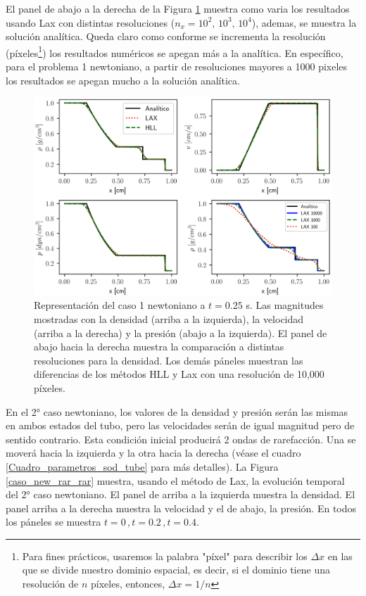 \documentclass[12pt,a4paper]{book}
\begin{document}
El panel de abajo a la derecha de la Figura 
\ref{comparacion_analitico_newtoniano_caso_1} muestra como varia los resultados
usando Lax con distintas resoluciones ($n_x = 10^2, \, 10^3, \,10^4$), ademas, se muestra la solución
analítica.
Queda claro como 
conforme se incrementa la resolución (píxeles\footnote{Para fines prácticos, usaremos la palabra "píxel" para describir los $\Delta x$ en 
las que se divide nuestro dominio espacial, es decir, si el dominio tiene una resolución de $n$ 
píxeles, entonces, $\Delta x = 1/n$ }) los resultados numéricos se apegan más a la analítica. 
En específico, para el problema 1 newtoniano, a partir de resoluciones mayores a 1000 pixeles
los resultados 
se apegan mucho a la solución analítica.

\begin{figure}
  \centering
    \includegraphics[width=1.0\textwidth]{./Figuras/verificacion_del_codigo/rarefaction.png}
  \caption{Representación del caso 1 newtoniano a $t = 0.25$ s. Las magnitudes mostradas con
  la densidad (arriba a la izquierda), la velocidad (arriba a la derecha) y la presión (abajo a la 
  izquierda).
  El panel de abajo hacia la derecha muestra la comparación a distintas resoluciones para la densidad. Los demás páneles muestran
  las diferencias de los métodos HLL y Lax con una resolución de 10,000 píxeles.
  \label{comparacion_analitico_newtoniano_caso_1}}
\end{figure}

En el 2° caso newtoniano, los valores de la 
densidad
y presión serán las mismas en ambos estados del tubo, pero las velocidades serán de igual magnitud
pero de sentido contrario. Esta condición inicial producirá 2 ondas de rarefacción. Una se moverá hacia
la izquierda y la otra hacia la derecha (véase el cuadro \ref{Cuadro_parametros_sod_tube} para más
detalles).
La Figura \ref{caso_new_rar_rar} muestra, usando
el método de Lax, la evolución temporal del 2° caso newtoniano. El panel de arriba a la izquierda muestra la densidad.
El panel arriba a la derecha muestra la velocidad y el de abajo, la presión. En todos los páneles se 
muestra $t = 0 \, , t = 0.2 \, ,t = 0.4$.
\end{document}
